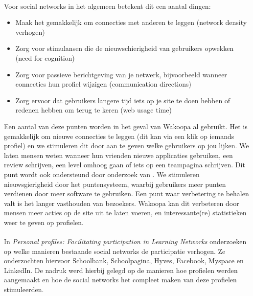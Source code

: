 \documentclass[a4paper, 10pt, pdftex]{article}
\begin{document}
        \paragraph{}
        Voor social networks in het algemeen betekent dit een aantal dingen:
        \begin{itemize}
          \item Maak het gemakkelijk om connecties met anderen te leggen (network density verhogen)
          \item Zorg voor stimulansen die de nieuwschierigheid van gebruikers opwekken (need for cognition)
          \item Zorg voor passieve berichtgeving van je netwerk, bijvoorbeeld wanneer connecties hun profiel wijzigen (communication directions)
          \item Zorg ervoor dat gebruikers langere tijd iets op je site te doen hebben of redenen hebben om terug te keren (web usage time)
        \end{itemize}
        Een aantal van deze punten worden in het geval van Wakoopa al gebruikt. Het is gemakkelijk om nieuwe connecties te leggen (dit kan via een klik op iemands profiel) en we stimuleren dit door aan te geven welke gebruikers op jou lijken. We laten mensen weten wanneer hun vrienden nieuwe applicaties gebruiken, een review schrijven, een level omhoog gaan of iets op een teampagina schrijven. Dit punt wordt ook ondersteund door onderzoek van \cite{Berlanga2007}. We stimuleren nieuwsgierigheid door het puntensysteem, waarbij gebruikers meer punten verdienen door meer software te gebruiken. Een punt waar verbetering te behalen valt is het langer vasthouden van bezoekers. Wakoopa kan dit verbeteren door mensen meer acties op de site uit te laten voeren, en interessante(re) statistieken weer te geven op profielen.

    \paragraph{\cite{Brouns2008}}

    In \emph{Personal profiles: Facilitating participation in Learning Networks} onderzoeken \citeauthor{Brouns2008} op welke manieren bestaande social networks de participatie verhogen. Ze onderzochten hiervoor Schoolbank, Schoolpagina, Hyves, Facebook, Myspace en LinkedIn. De nadruk werd hierbij gelegd op de manieren hoe profielen werden aangemaakt en hoe de social networks het compleet maken van deze profielen stimuleerden.
\end{document}
